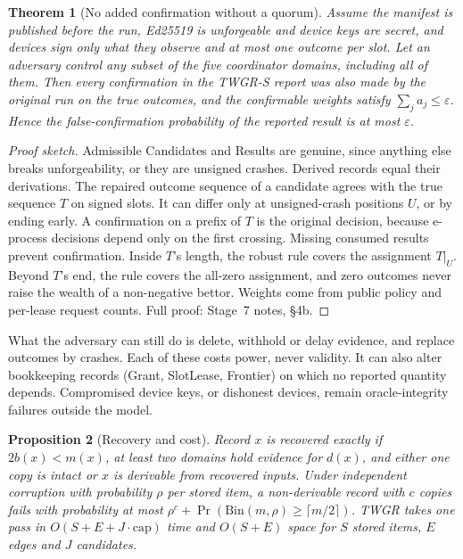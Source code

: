 \documentclass[pdflatex,sn-mathphys-num]{sn-jnl}
\theoremstyle{thmstyleone}
\newtheorem{theorem}{Theorem}
\newtheorem{proposition}[theorem]{Proposition}
\theoremstyle{thmstyletwo}
\theoremstyle{thmstylethree}
\begin{document}
\begin{theorem}[No added confirmation without a quorum]\label{thm:twgrs}
Assume the manifest is published before the run, Ed25519 is unforgeable and device keys are secret, and devices sign only what they observe and at most one outcome per slot. Let an adversary control any subset of the five coordinator domains, including all of them. Then every confirmation in the TWGR-S report was also made by the original run on the true outcomes, and the confirmable weights satisfy $\sum_j a_j\le\varepsilon$. Hence the false-confirmation probability of the reported result is at most $\varepsilon$.
\end{theorem}
\begin{proof}[Proof sketch]
Admissible Candidates and Results are genuine, since anything else breaks unforgeability, or they are unsigned crashes. Derived records equal their derivations. The repaired outcome sequence of a candidate agrees with the true sequence $T$ on signed slots. It can differ only at unsigned-crash positions $U$, or by ending early. A confirmation on a prefix of $T$ is the original decision, because e-process decisions depend only on the first crossing. Missing consumed results prevent confirmation. Inside $T$'s length, the robust rule covers the assignment $T|_U$. Beyond $T$'s end, the rule covers the all-zero assignment, and zero outcomes never raise the wealth of a non-negative bettor. Weights come from public policy and per-lease request counts. Full proof: Stage~7 notes, \S4b.
\end{proof}

What the adversary can still do is delete, withhold or delay evidence, and replace outcomes by crashes. Each of these costs power, never validity. It can also alter bookkeeping records (Grant, SlotLease, Frontier) on which no reported quantity depends. Compromised device keys, or dishonest devices, remain oracle-integrity failures outside the model.

\begin{proposition}[Recovery and cost]\label{prop:recovery}
Record $x$ is recovered exactly if $2b(x)<m(x)$, at least two domains hold evidence for $d(x)$, and either one copy is intact or $x$ is derivable from recovered inputs. Under independent corruption with probability $\rho$ per stored item, a non-derivable record with $c$ copies fails with probability at most $\rho^{c}+\Pr(\mathrm{Bin}(m,\rho)\ge\lceil m/2\rceil)$. TWGR takes one pass in $O(S+E+J\cdot\mathrm{cap})$ time and $O(S+E)$ space for $S$ stored items, $E$ edges and $J$ candidates.
\end{proposition}
\end{document}
